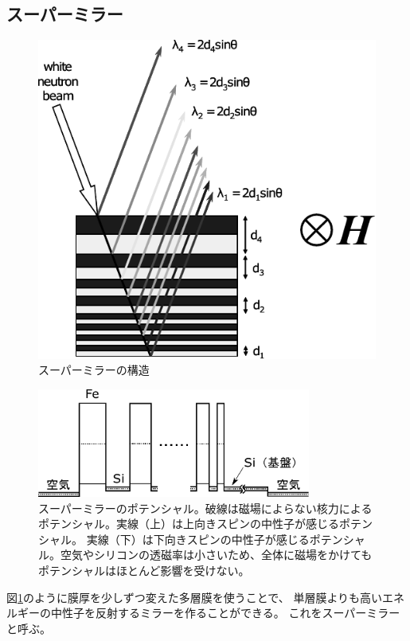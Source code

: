\subsection{スーパーミラー}
\begin{figure}[H]
\centering
\includegraphics{mirror/super_mirror.pdf}
\caption{スーパーミラーの構造\cite{seki}\label{mirror_super_mirror}}
\end{figure}
\begin{figure}[h]
\centering
\includegraphics[width=9cm]{mirror/super_mirror_potential.pdf}
\caption{スーパーミラーのポテンシャル。破線は磁場によらない核力によるポテンシャル。実線（上）は上向きスピンの中性子が感じるポテンシャル。
実線（下）は下向きスピンの中性子が感じるポテンシャル。空気やシリコンの透磁率は小さいため、全体に磁場をかけても
ポテンシャルはほとんど影響を受けない。}
\end{figure}
図\ref{mirror_super_mirror}のように膜厚を少しずつ変えた多層膜を使うことで、
単層膜よりも高いエネルギーの中性子を反射するミラーを作ることができる。
これをスーパーミラーと呼ぶ。

